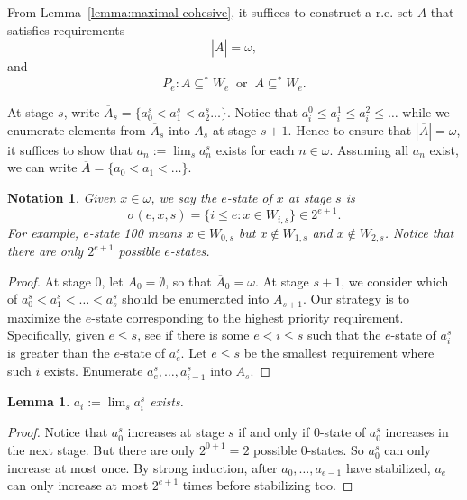 \documentclass{article}
\newtheorem{notation}{Notation}[subsection]
\newtheorem{lemma}{Lemma}[subsection]
\begin{document}
  From Lemma~\ref{lemma:maximal-cohesive}, it suffices to construct a r.e.
  set $A$ that satisfies requirements
  \begin{equation}
    |\overline{A}|=\omega,
    \label{eqn:R}
  \end{equation}
  and
  \begin{equation}
    P_e: \overline{A} \subseteq^*\overline{W}_e\;\; \text{or}\;\;
    \overline{A}\subseteq^* W_e.
    \label{eqn:P_e}
  \end{equation}

  At stage $s$, write $\overline{A}_s =\{a_0^s<a_1^s<a_2^s\ldots\}$. Notice
  that $a_i^0\leq a_i^1\leq a_i^2\leq\ldots$ while we enumerate elements
  from $\overline{A}_s$ into $A_s$ at stage $s+1$. Hence to ensure that
  $|\overline{A}|=\omega$, it suffices to show that $a_n:=\lim_s a_n^s$
  exists for each $n\in\omega$. Assuming all $a_n$ exist, we can write
  $\overline{A}=\{a_0<a_1<\ldots\}$.

  \begin{notation}
    Given $x\in\omega$, we say the $e$-state of $x$ at stage $s$ is
    \[\sigma(e,x,s) =\{i\leq e: x\in W_{i,s}\} \in 2^{e+1}.\]
    For example, $e$-state 100 means $x\in W_{0,s}$ but $x\not\in
    W_{1,s}$ and $x\not\in W_{2,s}$. Notice that there are only $2^{e+1}$
    possible $e$-states.
  \end{notation}

  \begin{proof}
    At stage 0, let $A_0=\emptyset$, so that $\overline{A}_0=\omega$. At
    stage $s+1$, we consider which of $a_0^s<a_1^s<\ldots<a_s^s$ should be
    enumerated into $A_{s+1}$. Our strategy is to maximize the $e$-state
    corresponding to the highest priority requirement. Specifically, given
    $e\leq s$, see if there is some $e<i\leq s$ such that the $e$-state of
    $a_i^s$ is greater than the $e$-state of $a_e^s$. Let $e\leq s$ be the
    smallest requirement where such $i$ exists. Enumerate
    $a_e^s,\ldots,a_{i-1}^s$ into $A_s$.
  \end{proof}

  \begin{lemma}
    $a_i:=\lim_s a_i^s$ exists.
  \end{lemma}
  \begin{proof}
    Notice that $a_0^s$ increases at stage $s$ if and only if $0$-state of
    $a_0^s$ increases in the next stage. But there are only $2^{0+1}=2$
    possible $0$-states. So $a_0^s$ can only increase at most once. By
    strong induction, after $a_0,\ldots,a_{e-1}$ have stabilized, $a_e$
    can only increase at most $2^{e+1}$ times before stabilizing too.
  \end{proof}
\end{document}
